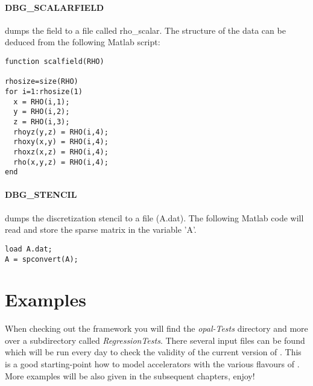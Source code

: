 \paragraph{DBG\_SCALARFIELD} dumps the field to a file called rho\_scalar. The structure of the data can be deduced from the following Matlab script:

\begin{verbatim}
function scalfield(RHO)

rhosize=size(RHO)
for i=1:rhosize(1)
  x = RHO(i,1);
  y = RHO(i,2);
  z = RHO(i,3);
  rhoyz(y,z) = RHO(i,4);
  rhoxy(x,y) = RHO(i,4);
  rhoxz(x,z) = RHO(i,4);
  rho(x,y,z) = RHO(i,4);
end
\end{verbatim}

\paragraph{DBG\_STENCIL} dumps the discretization stencil to a file (A.dat). The following Matlab code will read and store the sparse matrix in the variable 'A'.

\begin{verbatim}
load A.dat;
A = spconvert(A);
\end{verbatim}


\section{Examples}
When checking out the \opal framework you will find the {\em opal-Tests} directory and more over
a subdirectory called {\em RegressionTests}. There several input files can be found which will be 
run every day to check the validity of the current version of \opal. This is a good starting-point how to model
accelerators with the various flavours of \opal. More examples will be also given in the subsequent chapters, enjoy!



